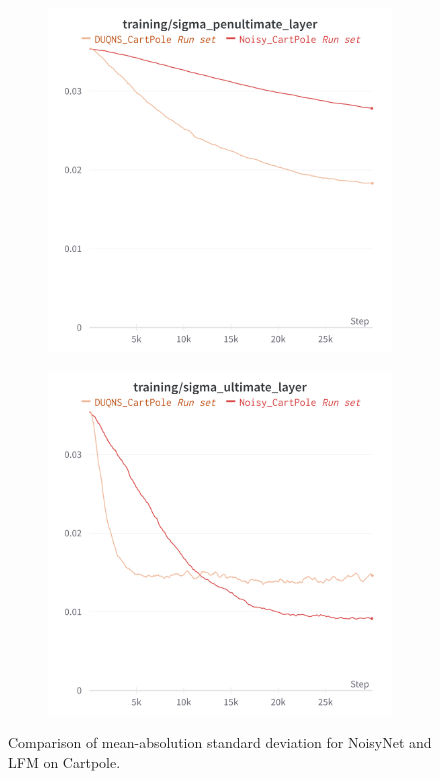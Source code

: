 \documentclass[]{uai2022} %
\begin{document}
\begin{figure}
    \centering
    \begin{subfigure}[b]{0.45\columnwidth}
        \centering
        \includegraphics[width=\columnwidth]{charts/penult}
    \end{subfigure}
    \begin{subfigure}[b]{0.45\columnwidth}
        \centering
        \includegraphics[width=\columnwidth]{charts/ult}
    \end{subfigure}
    \caption{Comparison of mean-absolution standard deviation for NoisyNet and LFM
    on Cartpole.}
    \label{fig:mean_std}
\end{figure}
\end{document}
